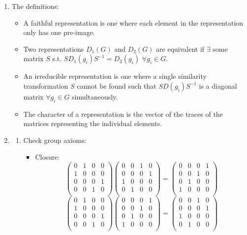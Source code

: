 \documentclass[a4paper]{article}
\begin{document}
\begin{ans}\leavevmode
\begin{enumerate}[label=(\roman*)]
\item The definitions:
\begin{itemize}
    \item A faithful representation is one where each element in the representation only has one pre-image.
    \item Two representations $D_1(G)$ and $D_2(G)$ are equivalent if $\exists$ some matrix $S$ s.t. $SD_1(g_i)S^{-1}=D_2(g_i)$ $\forall g_i\in G$.
    \item An irreducible representation is one where a single similarity transformation $S$ cannot be found such that $SD(g_i)S^{-1}$ is a diagonal matrix $\forall g_i\in G$ simultaneously.
    \item The character of a representation is the vector of the traces of the matrices representing the individual elements.
\end{itemize}
\item 
\begin{enumerate}[label=(\alph*)]
\item Check group axioms:
\begin{itemize}
    \item Closure: 
    $$\begin{pmatrix}0&1&0&0\\1&0&0&0\\0&0&0&1\\0&0&1&0\\\end{pmatrix}\begin{pmatrix}0&0&1&0\\0&0&0&1\\1&0&0&0\\0&1&0&0\\\end{pmatrix}=\begin{pmatrix}0&0&0&1\\0&0&1&0\\0&1&0&0\\1&0&0&0\\\end{pmatrix}$$
    $$\begin{pmatrix}0&1&0&0\\1&0&0&0\\0&0&0&1\\0&0&1&0\\\end{pmatrix}\begin{pmatrix}0&0&0&1\\0&0&1&0\\0&1&0&0\\1&0&0&0\\\end{pmatrix}=\begin{pmatrix}0&0&1&0\\0&0&0&1\\1&0&0&0\\0&1&0&0\\\end{pmatrix}$$

\end{itemize}
\end{enumerate}
\end{enumerate}
\end{ans}
\end{document}
